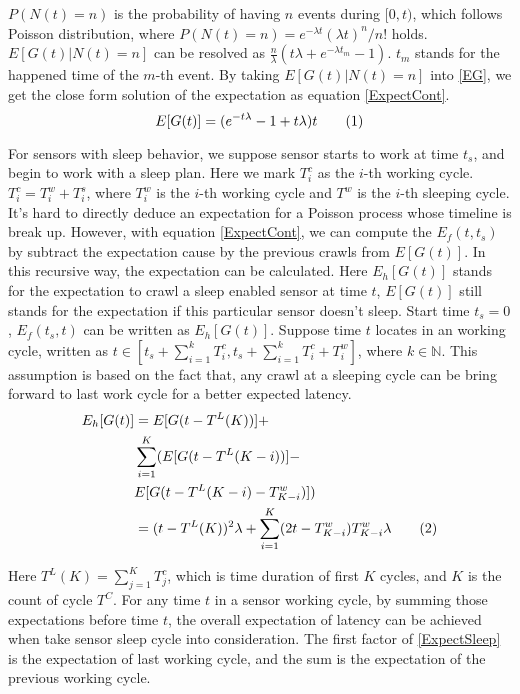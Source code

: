 \documentclass[conference]{IEEEtran}
\newcommand\numberthis{\addtocounter{equation}{1}\tag{\theequation}}
\begin{document}
$P(N(t)=n)$ is the probability of having $n$ events during $[0,t)$, which follows Poisson distribution, where $P(N(t)=n)=e^{-\lambda t}{(\lambda t)^n}/{n!}$ holds. 
$E[G(t)|N(t)=n]$ can be resolved as $\frac{n}{\lambda}(t\lambda+e^{-\lambda t_m}-1)$. 
$t_{m}$ stands for the happened time of the $m$-th event. 
By taking $E[G(t)|N(t)=n]$ into \eqref{EG}, we get the close form solution of the expectation as equation \eqref{ExpectCont}.
\begin{equation}
E[G(t)] = (e^{-t\lambda}-1+t \lambda)t \numberthis \label{ExpectCont}
\end{equation}

For sensors with sleep behavior, we suppose sensor starts to work at time $t_s$, and begin to work with a sleep plan.
Here we mark $T^{c}_{i}$ as the $i$-th working cycle. 
$T^{c}_{i} = T^{w}_{i}+T^{s}_{i}$, where $T^{w}_{i}$ is the $i$-th working cycle and $T^{w}$ is the $i$-th sleeping cycle. 
It's hard to directly deduce an expectation for a Poisson process whose timeline is break up.
However, with equation \eqref{ExpectCont}, we can compute the $E_f(t, t_s)$ by subtract the expectation cause by the previous crawls from $E[G(t)]$. 
In this recursive way, the expectation can be calculated. 
Here $E_h[G(t)]$ stands for the expectation to crawl a sleep enabled sensor at time $t$, $E[G(t)]$ still stands for the expectation if this particular sensor doesn't sleep.
Start time $t_s=0$, $E_f(t_s,t)$ can be written as $E_h[G(t)]$.
Suppose time $t$ locates in an working cycle, written as $t \in [t_s + \sum_{i=1}^{k} T^{c}_{i}, t_s + \sum_{i=1}^{k} T^{c}_{i} + T^{w}_{i}]$, where $k\in\mathbb{N}$. 
This assumption is based on the fact that, any crawl at a sleeping cycle can be bring forward to last work cycle for a better expected latency.
\begin{align*}
E_h[G(t)] & = E[G(t-T^{L}(K))] + \\
	& \sum_{i=1}^{K}(E[G(t-T^{L}(K-i))]-\\
	& E[G(t-T^{L}(K-i)-T^{w}_{K-i})])\\
	& = (t-T^{L}(K))^2\lambda + \sum_{i=1}^{K} (2 t - T^{w}_{K-i})T^{w}_{K-i}\lambda 
	\numberthis \label{ExpectSleep}
\end{align*}

Here $T^{L}(K) = \sum_{j=1}^{K} T^{c}_{j}$, which is time duration of first $K$ cycles, and $K$ is the count of cycle $T^{C}$. 
For any time $t$ in a sensor working cycle, by summing those expectations before time $t$, the overall expectation of latency can be achieved when take sensor sleep cycle into consideration. 
The first factor of \eqref{ExpectSleep} is the expectation of last working cycle, and the sum is the expectation of the previous working cycle.
\end{document}
